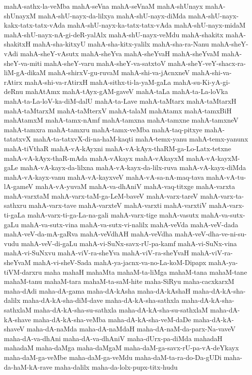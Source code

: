 {mahA-sathx-la-veMba
mahA-seVna
mahA-seVnaM
mahA-shUnayx
mahA-shUnayxM
mahA-shU-nayx-da-lilxya
mahA-shU-nayx-diMda
mahA-shU-nayx-kakx-tatx-tatx-vAda
mahA-shU-nayx-ka-tatx-tatx-vAda
mahA-shU-nayx-midaM
mahA-shU-nayx-nA-gi-deR-yalAlx
mahA-shU-nayx-veMdu
mahA-shakitx
mahA-shakitxH
mahA-sha-kitxyU
mahA-sha-kitx-yalilx
mahA-sha-ra-Nanu
mahA-sheY-vAdi
mahA-sheY-vAsutx
mahA-sheYva
mahA-sheYvaH
mahA-sheYvaM
mahA-sheY-va-miti
mahA-sheY-varu
mahA-sheY-va-satxtoV
mahA-sheY-veY-shacx-ra-liM-gA-dikaM
mahA-shirxV-gu-ruvaM
mahA-shi-va-jAcnxneV
mahA-shi-va-rAtirx
mahA-shi-va-rAtirxH
mahA-sithx-ti-la-yaM-gaLa
mahA-su-Ki-yA-gi-deRnu
mahAtAmx
mahA-tAyx-gAM-gaveV
mahA-taLa
mahA-ta-La-loVka
mahA-ta-La-loV-ka-diM-dalU
mahA-ta-Lave
mahA-taMtarx
mahA-taMtarxH
mahA-taMtarxM
mahA-taMterxV
mahA-talaM
mahAtamx
mahA-tamxBiH
mahAtamxM
mahA-tamx-nAmf
mahA-tamxna
mahA-tamxne
mahA-tamxneV
mahA-tamxra
mahA-tamxru
mahA-tamx-veMba
mahA-taq-pitxye
mahA-tatatxvX
mahA-ta-tatxvX-di-na-haM-kaqti
mahA-temx-yanu
mahA-temx-yanunx
mahA-tiVthaR
mahA-vA-kAyxni
mahA-vA-kAyx-thaRM-ga-Lo-Latx-tetxne
mahA-vA-kAyx-thaR-mAda
mahA-vAkayx
mahA-vAkayxM
mahA-vA-kayxM-gaLe
mahA-vA-kayx-da-lilxna
mahA-vA-kayx-da-lilx-ruva
mahA-vA-kayx-diMda
mahA-vA-kayx-vanu
mahA-vA-kayxveV
mahA-vA-sa-nA-maq-tava
mahA-vA-tu-lA-gameV
mahA-vA-yuvaM
mahA-va-dhAniV
mahA-vaq-titxge
mahA-varxta
mahA-varxtaM
mahA-varx-taM-ga-LeM-baveV
mahA-varx-tareV
mahA-varx-ta-sathxru
mahA-varx-tave
mahA-varxteV
mahA-varxti
mahA-varxtiV
mahA-varx-ti-gaLa
mahA-varx-ti-ga-La-na-gali
mahA-varx-tige
mahA-vasutx
mahA-va-sutx-gaLu
mahA-va-sutx-vina
mahA-va-sutx-vi-nalilx
mahA-veVda
mahA-veV-dada
mahA-veV-da-mA-gaRva
mahA-veVdhAH
mahA-veVdha
mahA-veV-dha-ve-ni-su-vudu
mahA-veV-di-gaLu
mahA-vi-SuNx-savx-rU-pa-kamf
mahA-vi-SuNx-vina
mahA-vi-SuNxvu
mahA-viV-ra-sheYva
mahA-viV-ra-sheYvaH
mahA-viV-ra-sheYvaM
mahA-vi-sheV-Sada
mahA-ya-jacnx-va-no-La-koM-Dipapx
mahA-ya-tiVM-darxru
maha
mahaH
mahaMta
mahaM-ta-liMga
mahaM-tana
mahaM-tane
mahaM-tanu
mahaM-tara
mahaM-ta-saM-hite
maha-SiRyu
maha-cacxkarxM
maha-dAdi
maha-dA-gama
maha-dA-kAsha
maha-dA-kAshaH
maha-dA-kA-sha-dalilx
maha-dA-kA-sha-diM-dave
maha-dA-kA-sha-sathxla
maha-dA-kA-sha-sathxlaM
maha-dA-kA-sha-su-sathxla
maha-dA-kA-sha-su-sathxlaM
maha-dA-kA-shave
maha-dA-kA-sha-veMba
maha-dA-kA-sha-veM-daDe
maha-dA-kA-shaveV
maha-dA-naMda
maha-dA-naMdaH
maha-dA-naM-da-parx-Na-vaveV
maha-dA-va-dhAni
maha-dA-va-dhAniV
maha-dUrx-pa-diMda
mahadaH
mahadaM
maha-daMga
maha-daMgaM
maha-daM-ga-savx-rU-pa-vA-deYkayx
maha-daM-ga-veMbe
maha-daM-ga-veMdu
maha-daM-ta-ra-do-Da-gUDi
maha-da-haM-kA-rave
maha-dalilx
maha-da-lolx-pupx-titx-hudu
}
